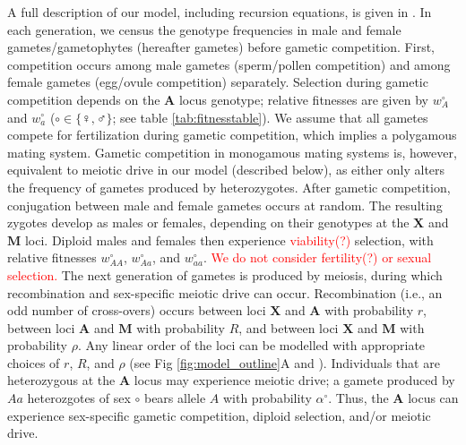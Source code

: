 \documentclass[10pt,letterpaper]{article}
\begin{document}
A full description of our model, including recursion equations, is given in . 
In each generation, we census the genotype frequencies in male and female gametes/gametophytes (hereafter gametes) before gametic competition. 
First, competition occurs among male gametes (sperm/pollen competition) and among female gametes (egg/ovule competition) separately. 
Selection during gametic competition depends on the $\mathbf{A}$ locus genotype; relative fitnesses are given by $w_A^\circ$ and $w_a^\circ$ ($\circ \in \{\female,\male\}$; see table \ref{tab:fitnesstable}). %
We assume that all gametes compete for fertilization during gametic competition, which implies a polygamous mating system. 
Gametic competition in monogamous mating systems is, however, equivalent to meiotic drive in our model (described below), as either only alters the frequency of gametes produced by heterozygotes. 
After gametic competition, conjugation between male and female gametes occurs at random.
The resulting zygotes develop as males or females, depending on their genotypes at the $\mathbf{X}$ and $\mathbf{M}$ loci. %
Diploid males and females then experience \textcolor{red}{viability(?)} selection, with relative fitnesses $w_{AA}^{\circ}$, $w_{Aa}^{\circ}$, and $w_{aa}^{\circ}$. %
\textcolor{red}{We do not consider fertility(?) or sexual selection.}
The next generation of gametes is produced by meiosis, during which recombination and sex-specific meiotic drive can occur. 
Recombination (i.e., an odd number of cross-overs) occurs between loci $\mathbf{X}$ and $\mathbf{A}$ with probability $r$, between loci $\mathbf{A}$ and $\mathbf{M}$ with probability $R$, and between loci $\mathbf{X}$ and $\mathbf{M}$ with probability $\rho$.
Any linear order of the loci can be modelled with appropriate choices of $r$, $R$, and $\rho$ (see Fig \ref{fig:model_outline}A and ). 
Individuals that are heterozygous at the $\mathbf{A}$ locus may experience meiotic drive; a gamete produced by $Aa$ heterozgotes of sex $\circ$ bears allele $A$ with probability $\alpha^\circ$. 
Thus, the $\mathbf{A}$ locus can experience sex-specific gametic competition, diploid selection, and/or meiotic drive. 
\end{document}
